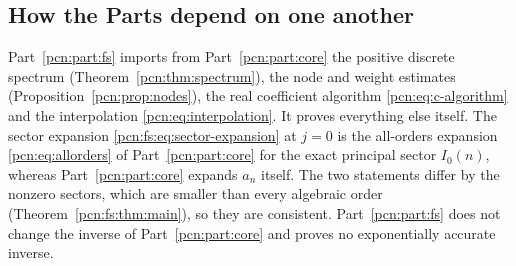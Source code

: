 \documentclass[11pt,letterpaper]{article}
\theoremstyle{remark}\newtheorem{remark}[theorem]{Remark}
\begin{document}
\subsection*{How the Parts depend on one another}
\label{pcn:guide:dependencies}
Part~\ref{pcn:part:fs} imports from Part~\ref{pcn:part:core} the positive discrete spectrum (Theorem~\ref{pcn:thm:spectrum}), the node and weight estimates (Proposition~\ref{pcn:prop:nodes}), the real coefficient algorithm \eqref{pcn:eq:c-algorithm} and the interpolation \eqref{pcn:eq:interpolation}. It proves everything else itself. The sector expansion \eqref{pcn:fs:eq:sector-expansion} at $j=0$ is the all-orders expansion \eqref{pcn:eq:allorders} of Part~\ref{pcn:part:core} for the exact principal sector $I_0(n)$, whereas Part~\ref{pcn:part:core} expands $a_n$ itself. The two statements differ by the nonzero sectors, which are smaller than every algebraic order (Theorem~\ref{pcn:fs:thm:main}), so they are consistent. Part~\ref{pcn:part:fs} does not change the inverse of Part~\ref{pcn:part:core} and proves no exponentially accurate inverse.
\end{document}
